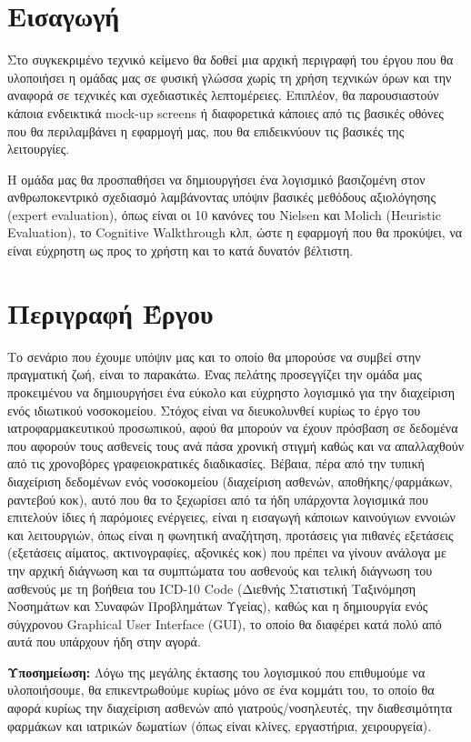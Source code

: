 \documentclass{article}
\begin{document}
{
  \hypersetup{linkcolor=black}
  \tableofcontents
}

\section{Εισαγωγή}
    Στο συγκεκριμένο τεχνικό κείμενο θα δοθεί μια αρχική περιγραφή του έργου που θα υλοποιήσει η ομάδας μας σε φυσική γλώσσα χωρίς τη χρήση τεχνικών όρων και την αναφορά σε τεχνικές και σχεδιαστικές λεπτομέρειες. Επιπλέον, θα παρουσιαστούν κάποια ενδεικτικά mock-up screens ή διαφορετικά κάποιες από τις βασικές οθόνες που θα περιλαμβάνει η εφαρμογή μας, που θα επιδεικνύουν τις βασικές της λειτουργίες. \par
    Η ομάδα μας θα προσπαθήσει να δημιουργήσει ένα λογισμικό βασιζομένη στον ανθρωποκεντρικό σχεδιασμό λαμβάνοντας υπόψιν βασικές μεθόδους αξιολόγησης (expert evaluation), όπως είναι οι 10 κανόνες του Nielsen και Molich (Heuristic Evaluation), 
    το Cognitive Walkthrough κλπ, ώστε η εφαρμογή που θα προκύψει, να είναι εύχρηστη ως προς το χρήστη και το κατά δυνατόν βέλτιστη.
    

\section{Περιγραφή Έργου}

Το σενάριο που έχουμε υπόψιν μας και το οποίο θα μπορούσε να συμβεί στην πραγματική ζωή, είναι το παρακάτω. Ένας πελάτης προσεγγίζει την ομάδα μας προκειμένου να δημιουργήσει ένα εύκολο και εύχρηστο λογισμικό για την διαχείριση ενός ιδιωτικού νοσοκομείου. Στόχος είναι να διευκολυνθεί κυρίως το έργο του ιατροφαρμακευτικού προσωπικού, αφού θα μπορούν να έχουν πρόσβαση σε δεδομένα που αφορούν τους ασθενείς τους ανά πάσα χρονική στιγμή καθώς και να απαλλαχθούν από τις χρονοβόρες γραφειοκρατικές διαδικασίες. Βέβαια, πέρα από την τυπική διαχείριση δεδομένων ενός νοσοκομείου (διαχείριση ασθενών, αποθήκης/φαρμάκων, ραντεβού κοκ), αυτό που θα το ξεχωρίσει από τα ήδη υπάρχοντα λογισμικά που επιτελούν ίδιες ή παρόμοιες ενέργειες, είναι η εισαγωγή κάποιων καινούγιων εννοιών και λειτουργιών, όπως είναι η φωνητική αναζήτηση, προτάσεις για πιθανές εξετάσεις (εξετάσεις αίματος, ακτινογραφίες, αξονικές κοκ) που πρέπει να γίνουν ανάλογα με την αρχική διάγνωση και τα συμπτώματα του ασθενούς και τελική διάγνωση του ασθενούς με τη βοήθεια του ICD-10 Code (Διεθνής Στατιστική Ταξινόμηση Νοσημάτων και Συναφών Προβλημάτων Υγείας), καθώς και η δημιουργία ενός σύγχρονου Graphical User Interface (GUI), το οποίο θα διαφέρει κατά πολύ από αυτά που υπάρχουν ήδη στην αγορά. \par
\textbf{Υποσημείωση:} Λόγω της μεγάλης έκτασης του λογισμικού που επιθυμούμε να υλοποιήσουμε, θα επικεντρωθούμε κυρίως μόνο σε ένα κομμάτι του, το οποίο θα αφορά κυρίως την διαχείριση ασθενών από γιατρούς/νοσηλευτές, την διαθεσιμότητα φαρμάκων και ιατρικών δωματίων (όπως είναι κλίνες, εργαστήρια, χειρουργεία).
\end{document}
